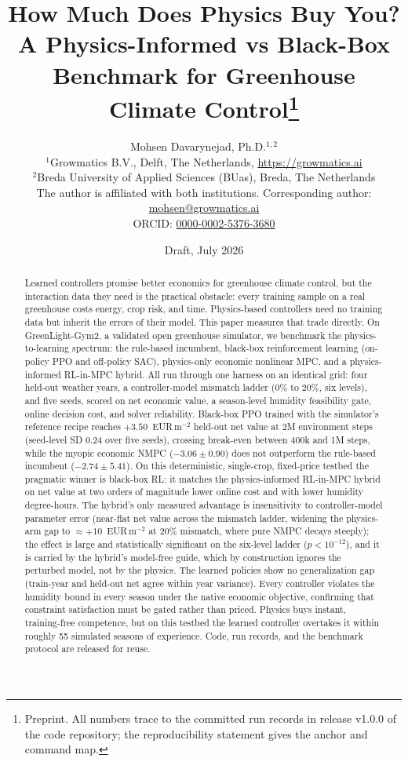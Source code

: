 \documentclass[11pt]{article}
\title{How Much Does Physics Buy You?\\ A Physics-Informed vs Black-Box Benchmark for Greenhouse Climate Control\thanks{Preprint. All numbers trace to the committed run records in release v1.0.0 of the code repository; the reproducibility statement gives the anchor and command map.}}
\author{Mohsen Davarynejad, Ph.D.$^{1,2}$ \\ \small $^{1}$Growmatics B.V., Delft, The Netherlands, \url{https://growmatics.ai} \\ \small $^{2}$Breda University of Applied Sciences (BUas), Breda, The Netherlands \\ \small The author is affiliated with both institutions. Corresponding author: \href{mailto:mohsen@growmatics.ai}{mohsen@growmatics.ai} \\ \small ORCID: \href{https://orcid.org/0000-0002-5376-3680}{0000-0002-5376-3680}}
\date{Draft, July 2026}
\begin{document}
\maketitle

\begin{abstract}
Learned controllers promise better economics for greenhouse climate control, but the interaction data they need is the practical obstacle: every training sample on a real greenhouse costs energy, crop risk, and time. Physics-based controllers need no training data but inherit the errors of their model. This paper measures that trade directly. On GreenLight-Gym2, a validated open greenhouse simulator, we benchmark the physics-to-learning spectrum: the rule-based incumbent, black-box reinforcement learning (on-policy PPO and off-policy SAC), physics-only economic nonlinear MPC, and a physics-informed RL-in-MPC hybrid. All run through one harness on an identical grid: four held-out weather years, a controller-model mismatch ladder ($0\%$ to $20\%$, six levels), and five seeds, scored on net economic value, a season-level humidity feasibility gate, online decision cost, and solver reliability. Black-box PPO trained with the simulator's reference recipe reaches $+3.50$~EUR\,m$^{-2}$ held-out net value at 2M environment steps (seed-level SD $0.24$ over five seeds), crossing break-even between 400k and 1M steps, while the myopic economic NMPC ($-3.06 \pm 0.90$) does not outperform the rule-based incumbent ($-2.74 \pm 5.41$). On this deterministic, single-crop, fixed-price testbed the pragmatic winner is black-box RL: it matches the physics-informed RL-in-MPC hybrid on net value at two orders of magnitude lower online cost and with lower humidity degree-hours. The hybrid's only measured advantage is insensitivity to controller-model parameter error (near-flat net value across the mismatch ladder, widening the physics-arm gap to ${\approx}+10$~EUR\,m$^{-2}$ at $20\%$ mismatch, where pure NMPC decays steeply); the effect is large and statistically significant on the six-level ladder ($p < 10^{-12}$), and it is carried by the hybrid's model-free guide, which by construction ignores the perturbed model, not by the physics. The learned policies show no generalization gap (train-year and held-out net agree within year variance). Every controller violates the humidity bound in every season under the native economic objective, confirming that constraint satisfaction must be gated rather than priced. Physics buys instant, training-free competence, but on this testbed the learned controller overtakes it within roughly 55 simulated seasons of experience. Code, run records, and the benchmark protocol are released for reuse.
\end{abstract}
\end{document}
